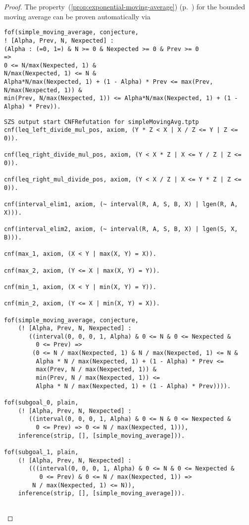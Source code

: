 \begin{proof}
  The property~(\ref{prop:exponential-moving-average})
  (p.~\pageref{prop:exponential-moving-average}) for the bounded moving average
  can be proven automatically via

\begin{verbatim}
fof(simple_moving_average, conjecture,
! [Alpha, Prev, N, Nexpected] :
(Alpha : (=0, 1=) & N >= 0 & Nexpected >= 0 & Prev >= 0
=>
0 <= N/max(Nexpected, 1) &
N/max(Nexpected, 1) <= N &
Alpha*N/max(Nexpected, 1) + (1 - Alpha) * Prev <= max(Prev, N/max(Nexpected, 1)) &
min(Prev, N/max(Nexpected, 1)) <= Alpha*N/max(Nexpected, 1) + (1 - Alpha) * Prev)).
\end{verbatim}

  \ifproofs
\begin{verbatim}
SZS output start CNFRefutation for simpleMovingAvg.tptp
cnf(leq_left_divide_mul_pos, axiom, (Y * Z < X | X / Z <= Y | Z <= 0)).

cnf(leq_right_divide_mul_pos, axiom, (Y < X * Z | X <= Y / Z | Z <= 0)).

cnf(leq_right_mul_divide_pos, axiom, (Y < X / Z | X <= Y * Z | Z <= 0)).

cnf(interval_elim1, axiom, (~ interval(R, A, S, B, X) | lgen(R, A, X))).

cnf(interval_elim2, axiom, (~ interval(R, A, S, B, X) | lgen(S, X, B))).

cnf(max_1, axiom, (X < Y | max(X, Y) = X)).

cnf(max_2, axiom, (Y <= X | max(X, Y) = Y)).

cnf(min_1, axiom, (X < Y | min(X, Y) = Y)).

cnf(min_2, axiom, (Y <= X | min(X, Y) = X)).

fof(simple_moving_average, conjecture,
    (! [Alpha, Prev, N, Nexpected] :
       ((interval(0, 0, 0, 1, Alpha) & 0 <= N & 0 <= Nexpected &
         0 <= Prev) =>
        (0 <= N / max(Nexpected, 1) & N / max(Nexpected, 1) <= N &
         Alpha * N / max(Nexpected, 1) + (1 - Alpha) * Prev <=
         max(Prev, N / max(Nexpected, 1)) &
         min(Prev, N / max(Nexpected, 1)) <=
         Alpha * N / max(Nexpected, 1) + (1 - Alpha) * Prev)))).

fof(subgoal_0, plain,
    (! [Alpha, Prev, N, Nexpected] :
       ((interval(0, 0, 0, 1, Alpha) & 0 <= N & 0 <= Nexpected &
         0 <= Prev) => 0 <= N / max(Nexpected, 1))),
    inference(strip, [], [simple_moving_average])).

fof(subgoal_1, plain,
    (! [Alpha, Prev, N, Nexpected] :
       (((interval(0, 0, 0, 1, Alpha) & 0 <= N & 0 <= Nexpected &
          0 <= Prev) & 0 <= N / max(Nexpected, 1)) =>
        N / max(Nexpected, 1) <= N)),
    inference(strip, [], [simple_moving_average])).


\end{verbatim}
\end{proof}
